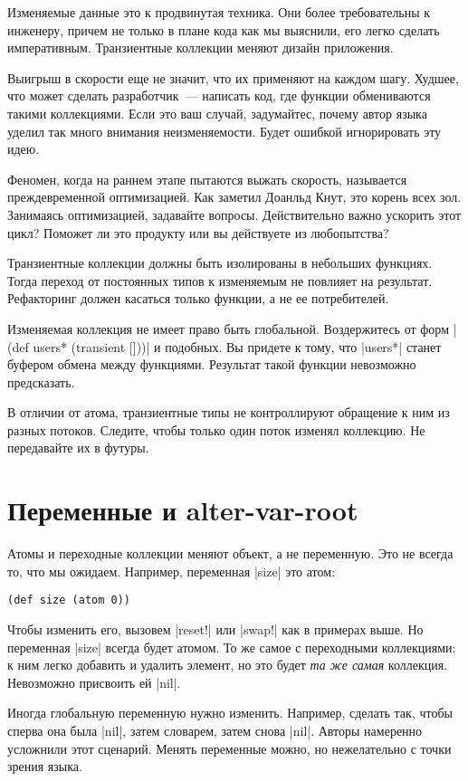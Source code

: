 Изменяемые данные это к продвинутая техника. Они более требовательны к инженеру,
причем не только в плане кода как мы выяснили, его легко сделать
императивным. Транзиентные коллекции меняют дизайн приложения.

Выигрыш в скорости еще не значит, что их применяют на каждом шагу. Худшее, что
может сделать разработчик~--- написать код, где функции обмениваются такими
коллекциями. Если это ваш случай, задумайтес, почему автор языка уделил так
много внимания неизменяемости. Будет ошибкой игнорировать эту идею.

Феномен, когда на раннем этапе пытаются выжать скорость, называется
преждевременной оптимизацией. Как заметил Доанльд Кнут, это корень всех зол.
Занимаясь оптимизацией, задавайте вопросы. Действительно важно ускорить этот
цикл? Поможет ли это продукту или вы действуете из любопытства?

Транзиентные коллекции должны быть изолированы в небольших функциях. Тогда
переход от постоянных типов к изменяемым не повлияет на результат. Рефакторинг
должен касаться только функции, а не ее потребителей.

Изменяемая коллекция не имеет право быть глобальной. Воздержитесь от форм
\spverb|(def users* (transient []))| и подобных. Вы придете к тому, что
\spverb|users*| станет буфером обмена между функциями. Результат такой функции
невозможно предсказать.

В отличии от атома, транзиентные типы не контроллируют обращение к ним из разных
потоков. Следите, чтобы только один поток изменял коллекцию. Не передавайте их в
футуры.

\section{Переменные и alter-var-root}

Атомы и переходные коллекции меняют объект, а не переменную. Это не всегда то,
что мы ожидаем. Например, переменная \spverb|size| это атом:

\begin{verbatim}
(def size (atom 0))
\end{verbatim}

Чтобы изменить его, вызовем \spverb|reset!| или \spverb|swap!| как в примерах
выше. Но переменная \spverb|size| всегда будет атомом. То же самое с переходными
коллекциями: к ним легко добавить и удалить элемент, но это будет \emph{та же
  самая} коллекция. Невозможно присвоить ей \spverb|nil|.

Иногда глобальную переменную нужно изменить. Например, сделать так, чтобы сперва
она была \spverb|nil|, затем словарем, затем снова \spverb|nil|. Авторы
намеренно усложнили этот сценарий. Менять переменные можно, но нежелательно с
точки зрения языка.

